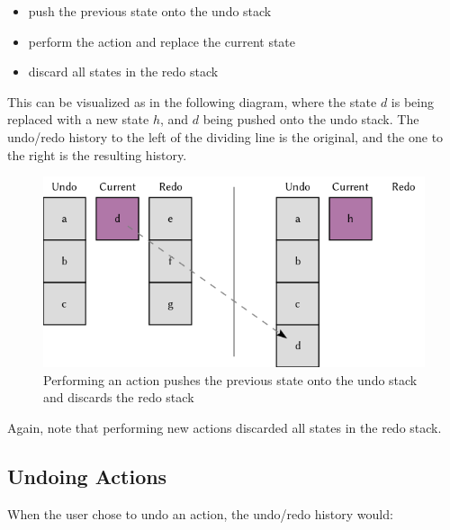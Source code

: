 \begin{itemize}
\item push the previous state onto the undo stack
\item perform the action and replace the current state
\item discard all states in the redo stack
\end{itemize}
This can be visualized as in the following diagram, where the state $d$ is being replaced with a new state $h$, and $d$ being pushed onto the undo stack. The undo/redo history to the left of the dividing line is the original, and the one to the right is the resulting history.
\begin{figure}[htbp]
 \centering
 \includegraphics[width=.95\linewidth]{./pics/case3_1.png}
 \caption{Performing an action pushes the previous state onto the undo stack and discards the redo stack}
 \label{fig:case3_1}
\end{figure}
Again, note that performing new actions discarded all states in the redo stack.

\subsection{Undoing Actions}

When the user chose to undo an action, the undo/redo history would:

